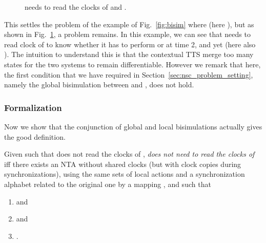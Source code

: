 \documentclass{LMCS}
\theoremstyle{plain}\newtheorem*{prop11}{Proposition~\ref{prop:states} bis}
\begin{document}
\begin{figure}[t]
  \centering
  \def\b{-0.4}
\def\c{2}
\def\d{1}
\def\a{\c+\d}
  \caption{ needs to read the clocks of  and
  . \label{fig:bisim2}}
\end{figure}

This settles the problem of the example of Fig.~\ref{fig:bisim} where
 (here ), but as shown in
Fig.~\ref{fig:bisim2}, a problem remains.
In this example, we can see that 
needs to read clock  of  to know whether it has to perform 
or  at time 2, and yet 
(here also ). The intuition
to understand this is that the contextual TTS merge too many states for the two
systems to remain differentiable. However we remark that here, the
first condition that we have required in Section~\ref{sec:nsc_problem_setting},
namely the global bisimulation between  and ,
does not hold.


\subsubsection{Formalization}
Now we show that the conjunction of global and local bisimulations actually
gives the good definition.

\begin{defi}\label{def:nsc}
  Given  such that  does not read the clocks of ,
   \emph{does not need to read the clocks of
    } iff there exists an NTA  without shared clocks
  (but with clock copies during synchronizations),
  using the same sets of local actions and a synchronization
  alphabet  related to the original one by a mapping , and such that
  \begin{enumerate}
    \item  and
    \item  and
    \item .
  \end{enumerate}
\end{defi}
\end{document}
